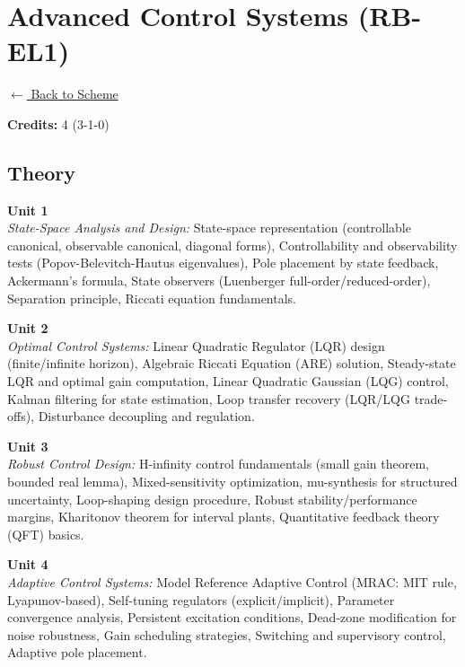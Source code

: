 \section*{Advanced Control Systems (RB-EL1)}
\label{elec:RB_1}

\noindent \small{\hyperref[main:scheme]{$\leftarrow$ Back to Scheme}} \vspace{0.5cm}

\noindent \textbf{Credits:} 4 (3-1-0)

\subsection*{Theory}
\noindent\textbf{Unit 1} \\
\textit{State-Space Analysis and Design:} State-space representation (controllable canonical, observable canonical, diagonal forms), Controllability and observability tests (Popov-Belevitch-Hautus eigenvalues), Pole placement by state feedback, Ackermann's formula, State observers (Luenberger full-order/reduced-order), Separation principle, Riccati equation fundamentals.

\vspace{0.3cm}

\noindent\textbf{Unit 2} \\
\textit{Optimal Control Systems:} Linear Quadratic Regulator (LQR) design (finite/infinite horizon), Algebraic Riccati Equation (ARE) solution, Steady-state LQR and optimal gain computation, Linear Quadratic Gaussian (LQG) control, Kalman filtering for state estimation, Loop transfer recovery (LQR/LQG trade-offs), Disturbance decoupling and regulation.

\vspace{0.3cm}

\noindent\textbf{Unit 3} \\
\textit{Robust Control Design:} H-infinity control fundamentals (small gain theorem, bounded real lemma), Mixed-sensitivity optimization, mu-synthesis for structured uncertainty, Loop-shaping design procedure, Robust stability/performance margins, Kharitonov theorem for interval plants, Quantitative feedback theory (QFT) basics.

\vspace{0.3cm}

\noindent\textbf{Unit 4} \\
\textit{Adaptive Control Systems:} Model Reference Adaptive Control (MRAC: MIT rule, Lyapunov-based), Self-tuning regulators (explicit/implicit), Parameter convergence analysis, Persistent excitation conditions, Dead-zone modification for noise robustness, Gain scheduling strategies, Switching and supervisory control, Adaptive pole placement.

